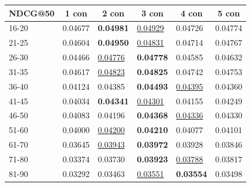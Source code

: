 \begin{table}[]
    \centering
    \begin{tabular}{|l|l|l|l|l|l|}
        \hline
        NDCG@50   & \multicolumn{1}{c|}{1 con} & \multicolumn{1}{c|}{2 con} & \multicolumn{1}{c|}{3 con} & \multicolumn{1}{c|}{4 con} & \multicolumn{1}{c|}{5 con} \\ \hline
        16-20     & 0.04677                    & \textbf{0.04981}           & \underline{0.04929}        & 0.04726                    & 0.04774                    \\ \hline
        21-25     & 0.04604                    & \textbf{0.04950}           & \underline{0.04831}        & 0.04714                    & 0.04767                    \\ \hline
        26-30     & 0.04466                    & \underline{0.04776}        & \textbf{0.04778}           & 0.04585                    & 0.04632                    \\ \hline
        31-35     & 0.04617                    & \underline{0.04823}        & \textbf{0.04825}           & 0.04742                    & 0.04753                    \\ \hline
        36-40     & 0.04124                    & 0.04385                    & \textbf{0.04493}           & \underline{0.04395}        & 0.04360                    \\ \hline
        41-45     & 0.04034                    & \textbf{0.04341}           & \underline{0.04301}        & 0.04155                    & 0.04249                    \\ \hline
        46-50     & 0.04083                    & 0.04196                    & \textbf{0.04368}           & \underline{0.04336}        & 0.04330                    \\ \hline
        51-60     & 0.04000                    & \underline{0.04200}        & \textbf{0.04210}           & 0.04077                    & 0.04101                    \\ \hline
        61-70     & 0.03645                    & \underline{0.03943}        & \textbf{0.03972}           & 0.03928                    & 0.03846                    \\ \hline
        71-80     & 0.03374                    & 0.03730                    & \textbf{0.03923}           & \underline{0.03788}        & 0.03817                    \\ \hline
        81-90     & 0.03292                    & 0.03463                    & \underline{0.03551}        & \textbf{0.03554}           & 0.03498                    \\ \hline

\end{tabular}
\end{table}
